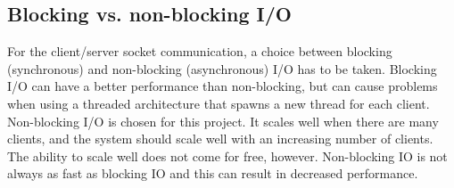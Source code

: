 \subsection{Blocking vs. non-blocking I/O}
For the client/server socket communication, a choice between blocking (synchronous) and non-blocking (asynchronous) I/O has to be taken.
Blocking I/O can have a better performance than non-blocking, but can cause problems when using a threaded architecture that spawns a new thread for each client.
Non-blocking I/O is chosen for this project. It scales well when there are many clients, and the system should scale well with an increasing number of clients. The ability to scale well does not come for free, however. Non-blocking IO is not always as fast as blocking IO and this can result in decreased performance. 
